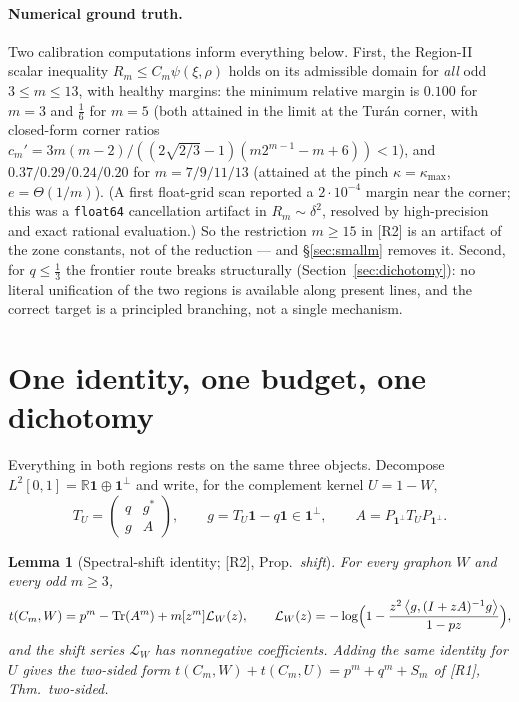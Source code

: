 \documentclass[11pt]{article}
\newtheorem{lemma}[theorem]{Lemma}
\theoremstyle{remark}
\theoremstyle{plain}
\theoremstyle{plain}
\newcommand{\one}{\mathbf 1}
\newcommand{\ip}[2]{\left\langle #1,#2\right\rangle}
\DeclareMathOperator{\Tr}{Tr}
\begin{document}
\paragraph{Numerical ground truth.}  Two calibration computations inform
everything below.  First, the Region-II scalar inequality
$R_m\le C_m\psi(\xi,\rho)$ holds on its admissible domain for \emph{all}
odd $3\le m\le13$, with healthy margins: the minimum relative margin is
$0.100$ for $m=3$ and $\tfrac16$ for $m=5$ (both attained in the limit at
the Tur\'an corner, with closed-form corner ratios
$c_m'=3m(m-2)/((2\sqrt{2/3}-1)(m2^{m-1}-m+6))<1$), and $0.37/0.29/0.24/0.20$
for $m=7/9/11/13$ (attained at the pinch $\kappa=\kappa_{\max}$,
$e=\Theta(1/m)$).  (A first float-grid scan reported a $2\cdot10^{-4}$
margin near the corner; this was a \texttt{float64} cancellation artifact
in $R_m\sim\delta^2$, resolved by high-precision and exact rational
evaluation.)  So the restriction $m\ge15$ in [R2] is an artifact of the
zone constants, not of the reduction --- and \S\ref{sec:smallm} removes it.
Second, for $q\le\tfrac13$ the frontier route breaks structurally
(Section~\ref{sec:dichotomy}): no literal unification of the two regions
is available along present lines, and the correct target is a principled
branching, not a single mechanism.

\section{One identity, one budget, one dichotomy}\label{sec:architecture}

Everything in both regions rests on the same three objects.  Decompose
$L^2[0,1]=\mathbb R\one\oplus\one^\perp$ and write, for the complement
kernel $U=1-W$,
\[
        T_U=\begin{pmatrix}q&g^*\\ g&A\end{pmatrix},
        \qquad g=T_U\one-q\one\in\one^\perp,
        \qquad A=P_{\one^\perp}T_UP_{\one^\perp}.
\]

\begin{lemma}[Spectral-shift identity; {[R2]}, Prop.~\emph{shift}]\label{lem:shift}
For every graphon $W$ and every odd $m\ge3$,
\[
        t(C_m,W)=p^m-\Tr(A^m)+m[z^m]\mathcal L_W(z),
        \qquad
        \mathcal L_W(z)=-\log\Bigl(1-\frac{z^2\ip g{(I+zA)^{-1}g}}{1-pz}\Bigr),
\]
and the shift series $\mathcal L_W$ has nonnegative coefficients.  Adding
the same identity for $U$ gives the two-sided form
$t(C_m,W)+t(C_m,U)=p^m+q^m+S_m$ of [R1], Thm.~\emph{two-sided}.
\end{lemma}
\end{document}
